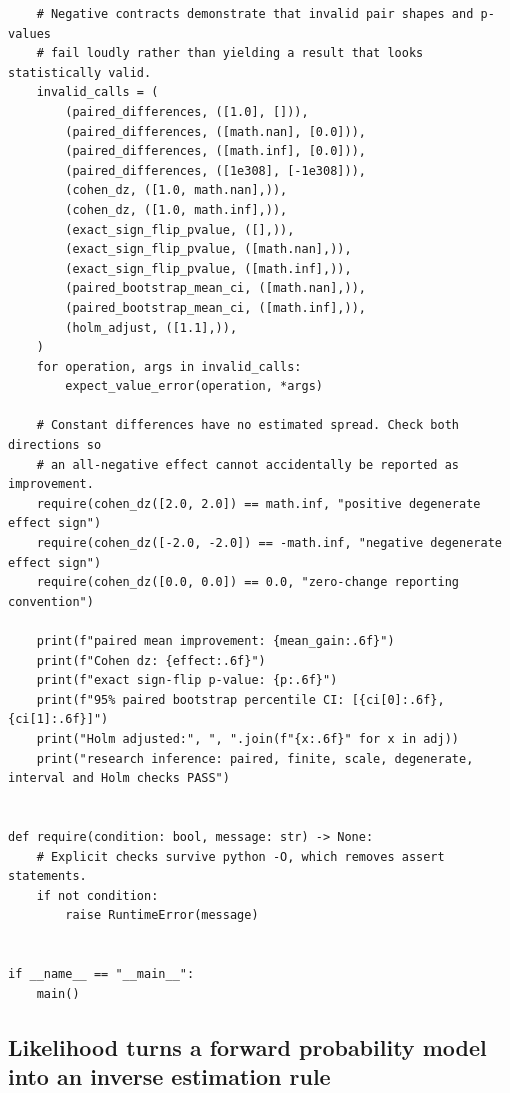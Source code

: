\begin{verbatim}
    # Negative contracts demonstrate that invalid pair shapes and p-values
    # fail loudly rather than yielding a result that looks statistically valid.
    invalid_calls = (
        (paired_differences, ([1.0], [])),
        (paired_differences, ([math.nan], [0.0])),
        (paired_differences, ([math.inf], [0.0])),
        (paired_differences, ([1e308], [-1e308])),
        (cohen_dz, ([1.0, math.nan],)),
        (cohen_dz, ([1.0, math.inf],)),
        (exact_sign_flip_pvalue, ([],)),
        (exact_sign_flip_pvalue, ([math.nan],)),
        (exact_sign_flip_pvalue, ([math.inf],)),
        (paired_bootstrap_mean_ci, ([math.nan],)),
        (paired_bootstrap_mean_ci, ([math.inf],)),
        (holm_adjust, ([1.1],)),
    )
    for operation, args in invalid_calls:
        expect_value_error(operation, *args)

    # Constant differences have no estimated spread. Check both directions so
    # an all-negative effect cannot accidentally be reported as improvement.
    require(cohen_dz([2.0, 2.0]) == math.inf, "positive degenerate effect sign")
    require(cohen_dz([-2.0, -2.0]) == -math.inf, "negative degenerate effect sign")
    require(cohen_dz([0.0, 0.0]) == 0.0, "zero-change reporting convention")

    print(f"paired mean improvement: {mean_gain:.6f}")
    print(f"Cohen dz: {effect:.6f}")
    print(f"exact sign-flip p-value: {p:.6f}")
    print(f"95% paired bootstrap percentile CI: [{ci[0]:.6f}, {ci[1]:.6f}]")
    print("Holm adjusted:", ", ".join(f"{x:.6f}" for x in adj))
    print("research inference: paired, finite, scale, degenerate, interval and Holm checks PASS")


def require(condition: bool, message: str) -> None:
    # Explicit checks survive python -O, which removes assert statements.
    if not condition:
        raise RuntimeError(message)


if __name__ == "__main__":
    main()
\end{verbatim}

\subsection{Likelihood turns a forward probability model into an inverse estimation rule}\label{02-foundations-ii-ch030-likelihood-turns-a-forward-probability-model-into-an-inverse-estimation-rule}

\hypertarget{02-foundations-ii-ch030-likelihood-turns-a-forward-probability-model-into-an-inverse-estimation-rule}{}

